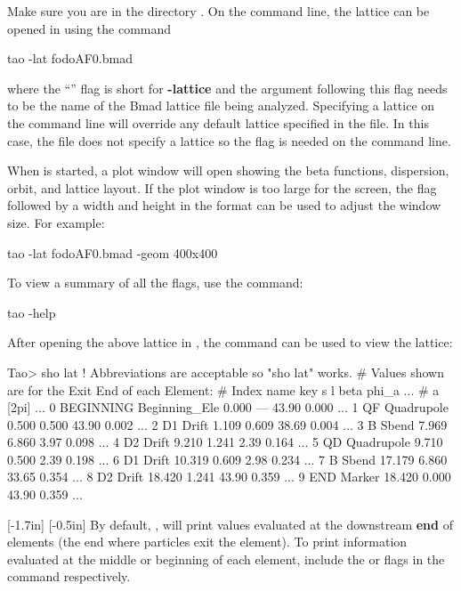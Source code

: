 \documentclass{hitec}     %
\begin{document}
Make sure you are in the directory .
On the command line, the lattice can be opened in \tao using the command 
\begin{code}
tao -lat fodoAF0.bmad
\end{code} 
where the ``'' flag is short for \textbf{-lattice} and the argument following this flag 
needs to be the name of the Bmad lattice file being analyzed. 
Specifying a lattice on the command line will override any default lattice specified in the 
file. 
In this case, the  file does not specify a lattice so the  flag is needed on the command line.

When \tao is started, a plot window will open showing the beta functions, dispersion, orbit, and lattice layout. If the plot window is too large for the screen, the  flag followed by a width and height in the format  can be used to adjust the window size. For example:
\begin{code}
tao -lat fodoAF0.bmad -geom 400x400
\end{code}
To view a summary of all the flags, use the command: 
\begin{code}
tao -help
\end{code}
After opening the above lattice in \tao, the  command can be used to view the lattice:
\begin{code}
Tao> sho lat     ! Abbreviations are acceptable so "sho lat" works.
# Values shown are for the Exit End of each Element:
# Index  name      key                       s       l    beta   phi_a ...
#                                                            a   [2pi] ...
      0  BEGINNING Beginning_Ele         0.000     ---   43.90   0.000 ... 
      1  QF        Quadrupole            0.500   0.500   43.90   0.002 ...
      2  D1        Drift                 1.109   0.609   38.69   0.004 ...
      3  B         Sbend                 7.969   6.860    3.97   0.098 ...
      4  D2        Drift                 9.210   1.241    2.39   0.164 ...
      5  QD        Quadrupole            9.710   0.500    2.39   0.198 ...
      6  D1        Drift                10.319   0.609    2.98   0.234 ...
      7  B         Sbend                17.179   6.860   33.65   0.354 ...
      8  D2        Drift                18.420   1.241   43.90   0.359 ...
      9  END       Marker               18.420   0.000   43.90   0.359 ...
\end{code}
%
[-1.7in]
%
[-0.5in]
%
By default, \tao, will print values evaluated at the downstream \textbf{end} of elements (the end where particles exit the element).
To print information evaluated at the middle or beginning of each element, include the  or  flags in the  command respectively.
\end{document}
